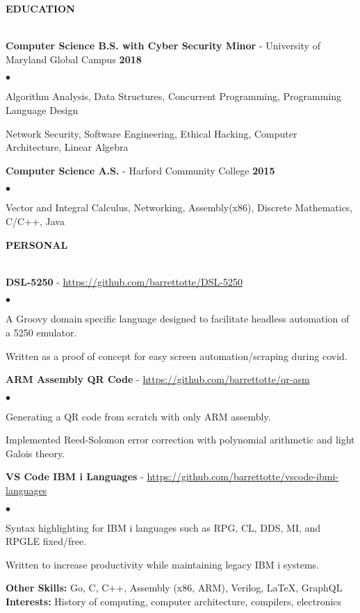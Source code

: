 \documentclass{article}
\newcommand{\lineunder}{
	\vspace*{-4pt}\\ 
	\hspace*{-18pt}\hrulefill \\
}
\newcommand{\header}[1]{
	{\hspace*{-15pt}\vspace*{6pt}\textsc{#1}}\vspace*{-6pt}\lineunder
}
\newcommand{\project}[2]{
	\vspace*{3pt} \textbf{#1} - \small{\href{#2}{#2}}
}
\newcommand{\education}[3]{
	\textbf{#1} - #2 \hfill \textbf{#3} \vspace*{3pt}
}
\newenvironment{resumelist}{
	\vspace*{2pt}
	\begin{list}
		{\small$\bullet$}{\topsep 0pt \itemsep -2pt}}{\vspace*{4pt}
	\end{list}
}
\newcommand{\resumeheader}[1]{
	\vspace*{14pt}
	\header{\textbf{#1}}
    \vspace*{5pt}
}
\begin{document}
	\resumeheader{EDUCATION}
		\education 
			{Computer Science B.S. with Cyber Security Minor}{University of Maryland Global Campus} 
			{2018}
			\begin{resumelist}
				\item Algorithm Analysis, Data Structures, Concurrent Programming, Programming Language Design
				\item Network Security, Software Engineering, Ethical Hacking, Computer Architecture, Linear Algebra
			\end{resumelist}
			\vspace*{6pt}
		\education
			{Computer Science A.S.}{Harford Community College}
			{2015}
			\begin{resumelist}
				\item Vector and Integral Calculus, Networking, Assembly(x86), Discrete Mathematics, C/C++, Java
			\end{resumelist}
	
	\resumeheader{PERSONAL}
		\project
			{DSL-5250}{https://github.com/barrettotte/DSL-5250}
			\begin{resumelist}
				\item A Groovy domain specific language designed to facilitate headless automation of a 5250 emulator.
				\item Written as a proof of concept for easy screen automation/scraping during covid.
			\end{resumelist}
		\project
			{ARM Assembly QR Code}{https://github.com/barrettotte/qr-asm}
			\begin{resumelist}
				\item Generating a QR code from scratch with only ARM assembly.
				\item Implemented Reed-Solomon error correction with polynomial arithmetic and light Galois theory.
			\end{resumelist}
		\project
			{VS Code IBM i Languages}{https://github.com/barrettotte/vscode-ibmi-languages}
			\begin{resumelist}
				\item Syntax highlighting for IBM i languages such as RPG, CL, DDS, MI, and RPGLE fixed/free.
				\item Written to increase productivity while maintaining legacy IBM i systems.
			\end{resumelist}
		\vspace*{12pt}
		\textbf{Other Skills:}
			Go, C, {C\tiny{++}}, Assembly (x86, ARM), Verilog, LaTeX, GraphQL\\
			\vspace*{5pt}
		\textbf{Interests:}
			History of computing, computer architecture, compilers, electronics\\
\end{document}
